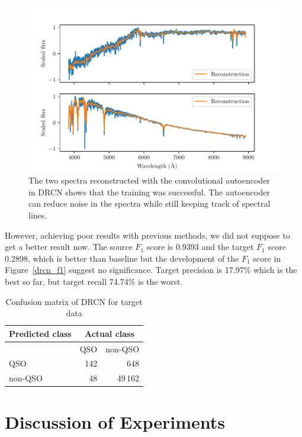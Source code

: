 \begin{figure}
\includegraphics[width=\textwidth]{img/reconstructed_spectra.pdf}
\caption[Spectra reconstructed with convolutional autoencoder]{
	The two spectra reconstructed with the convolutional autoencoder in DRCN shows that the training was successful.
	The autoencoder can reduce noise in the spectra
	while still keeping track of spectral lines.
}
\label{reconstruction}
\end{figure}

However, achieving poor results with previous methods,
we did not suppose to get a better result now.
The source \(F_1\) score is 0.9393 and the target \(F_1\) score 0.2898,
which is better than baseline
but the development of the \(F_1\) score in Figure~\ref{drcn_f1} suggest no significance.
Target precision is 17.97\% which is the best so far,
but target recall 74.74\% is the worst.

\begin{table}
\begin{center}
\begin{tabular}{|l|r|r|}
	\hline
	Predicted class & \multicolumn{2}{c|}{Actual class} \\
	\hline \hline
	& QSO & non-QSO \\ \hline
	QSO & 142 & 648 \\ \hline
	non-QSO & 48 & 49\,162 \\ \hline
\end{tabular}
\end{center}
\caption{Confusion matrix of DRCN for target data}
\end{table}

\section{Discussion of Experiments}

